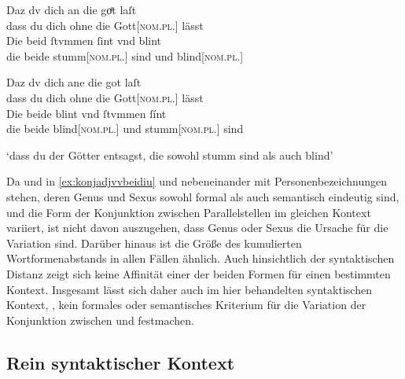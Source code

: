 \begin{exe}
\begin{xlist}
	\ex \label{ex:konjadjvvbeide_4} %
		\begin{taggedline}{\parencites[\pno~30rb,60--30rc,1]{kc:B1}[zu][10900\psqq]{schroeder1895}}
		\gll Daz dv dich an die goͤt laſt \\
			dass du dich ohne die Gott[\textsc{nom.pl.\MascX}] lässt \\
	\sn \gll Die beid ſtvmmen ſint vnd blint \\
			die beide stumm[\textsc{nom.pl.\MascM}] sind und blind[\textsc{nom.pl.\MascM}] \\
		\end{taggedline}
	
	\ex \label{ex:konjadjvvbeide_5} %
		\gll Daz dv dich ane die got laſt \\
			dass du dich ohne die Gott[\textsc{nom.pl.\MascX}] lässt \\
	\sn \gll Die beide blint vnd ſtvmmen ſínt \\
			die beide blind[\textsc{nom.pl.\MascM}] und stumm[\textsc{nom.pl.\MascM}] sind \\
		\begin{taggedline}{\parencites[\pno~51va,29--30]{kc:VB}[zu][10900\psqq]{schroeder1895}}
		\trans `dass du der Götter entsagst, die sowohl stumm sind als
			auch blind'
		\end{taggedline}
	\end{xlist}
\end{exe}

Da  und  in \cref{ex:konjadjvvbeidiu} und
 nebeneinander mit
Personenbezeichnungen stehen, deren Genus und Sexus sowohl formal als auch
semantisch eindeutig sind, und die Form der Konjunktion zwischen
Parallelstellen im gleichen Kontext variiert, ist nicht davon auszugehen, dass
Genus oder Sexus die Ursache für die Variation sind. Darüber hinaus ist die
Größe des kumulierten Wortformenabstands in allen Fällen ähnlich. Auch
hinsichtlich der syntaktischen Distanz zeigt sich keine Affinität einer der
beiden Formen für einen bestimmten Kontext. Insgesamt lässt sich daher auch im
hier behandelten syntaktischen Kontext, , kein formales oder semantisches Kriterium für die
Variation der Konjunktion zwischen  und  festmachen.

\subsection{Rein syntaktischer Kontext}
\label{subsec:kcbeidquantsyncont}

